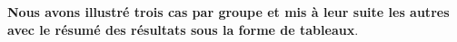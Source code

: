  
  \textbf{Nous avons illustré trois cas par groupe  et mis à leur suite les autres avec le résumé des 
 résultats 
 sous la forme de tableaux}.
 
 
 
 











